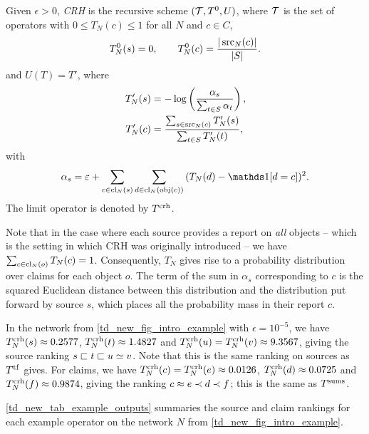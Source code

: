 \begin{definition}
    Given $\epsilon > 0$, \emph{CRH} is the recursive scheme $(\mathcal{T}, T^0, U)$,
    where $\mathcal{T}$ is the set of operators with $0 \le T_N(c) \le 1$ for all $N$
    and $c \in C$,
    \[
        T^0_N(s) = 0, \qquad
        T^0_N(c) = \frac{|\operatorname{src}_N(c)|}{|S|}.
    \]
    and $U(T) = T'$, where
    \begin{align*}
        T'_N(s) &= -\log\left(\frac{\alpha_s}{\sum_{t \in S}{\alpha_t}}\right), \\
        T'_N(c) &=
            \frac{\sum_{s \in \operatorname{src}_N(c)}{T'_N(s)}}{\sum_{t \in S}{T'_N(t)}},
    \end{align*}
    with
    \[
        \alpha_s = \epsilon + \sum_{c \in \claims_N(s)}{
            \sum_{d \in \claims_N(\obj(c))}{
                (T_N(d) - \indicator{d = c})^2
            }
        }.
    \]
    The limit operator is denoted by $T^{\operatorname{crh}}$.
\end{definition}

Note that in the case where each source provides a report on \emph{all} objects
-- which is the setting in which CRH was originally introduced -- we have
$\sum_{c \in \operatorname{cl}_N(o)}{T_N(c)} = 1$. Consequently, $T_N$ gives rise to a
probability distribution over claims for each object $o$. The term of the sum
in $\alpha_s$ corresponding to $c$ is the squared Euclidean distance between
this distribution and the distribution put forward by source $s$, which places
all the probability mass in their report $c$.

In the network from \cref{td_new_fig_intro_example} with $\epsilon = 10^{-5}$,
we have $T^{\operatorname{crh}}_N(s) \approx 0.2577$, $T^{\operatorname{crh}}_N(t) \approx 1.4827$ and $T^{\operatorname{crh}}_N(u) =
T^{\operatorname{crh}}_N(v) \approx 9.3567$, giving the source ranking $s \sqsubset t \sqsubset u \simeq v$.
Note that this is the same ranking on sources as $T^{\operatorname{tf}}$ gives. For
claims, we have $T^{\operatorname{crh}}_N(c) = T^{\operatorname{crh}}_N(e) \approx 0.0126$, $T^{\operatorname{crh}}_N(d) \approx
0.0725$ and $T^{\operatorname{crh}}_N(f) \approx 0.9874$, giving the ranking $c \approx e \prec d
\prec f$; this is the same as $T^{\operatorname{sums}}$.

\cref{td_new_tab_example_outputs} summaries the source and claim rankings for
each example operator on the network $N$ from \cref{td_new_fig_intro_example}.


